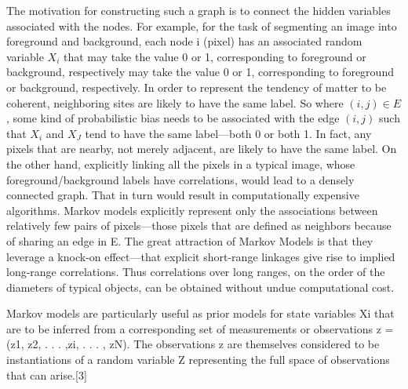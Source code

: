 The motivation for constructing such a graph is to connect the hidden variables associated with the nodes. For example, for the task of segmenting an image into foreground and background, each node i (pixel) has an associated random variable $X_i$ that may take the value 0 or 1, corresponding to foreground or background, respectively may take the value 0 or 1, corresponding to foreground or background, respectively. In order
to represent the tendency of matter to be coherent, neighboring sites are likely to have the
same label. So where $(i, j) \in E$, some kind of probabilistic bias needs to be associated with
the edge $(i,j)$ such that $X_i$ and $X_J$ tend to have the same label—both 0 or both 1. In fact, any
pixels that are nearby, not merely adjacent, are likely to have the same label. On the other
hand, explicitly linking all the pixels in a typical image, whose foreground/background
labels have correlations, would lead to a densely connected graph. That in turn would
result in computationally expensive algorithms. Markov models explicitly represent only
the associations between relatively few pairs of pixels—those pixels that are defined as
neighbors because of sharing an edge in E. The great attraction of Markov Models is that
they leverage a knock-on effect—that explicit short-range linkages give rise to implied
long-range correlations. Thus correlations over long ranges, on the order of the diameters of typical objects, can be obtained without undue computational cost.

Markov models are particularly useful as prior models for state variables Xi that are to
be inferred from a corresponding set of measurements or observations z = (z1, z2, . . . ,zi, . . . , zN). The observations z are themselves considered to be instantiations of a random variable Z representing the full space of observations that can arise.[3]